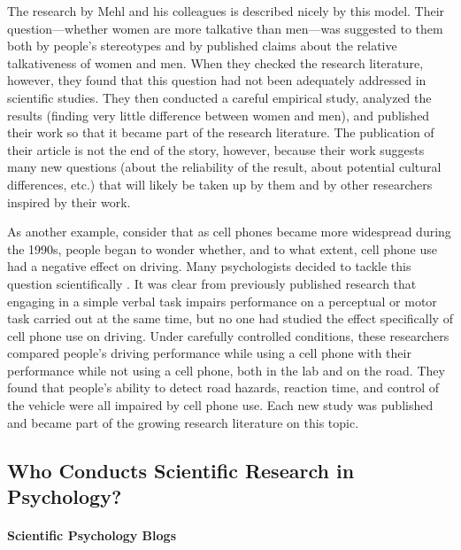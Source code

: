 The research by Mehl and his colleagues is described nicely by this model. Their question---whether women are more talkative than men---was suggested to them both by people's stereotypes and by published claims about the relative talkativeness of women and men. When they checked the research literature, however, they found that this question had not been adequately addressed in scientific studies. They then conducted a careful empirical study, analyzed the results (finding very little difference between women and men), and published their work so that it became part of the research literature. The publication of their article is not the end of the story, however, because their work suggests many new questions (about the reliability of the result, about potential cultural differences, etc.) that will likely be taken up by them and by other researchers inspired by their work.

As another example, consider that as cell phones became more widespread during the 1990s, people began to wonder whether, and to what extent, cell phone use had a negative effect on driving. Many psychologists decided to tackle this question scientifically \citep{collet_phoning_2010}. It was clear from previously published research that engaging in a simple verbal task impairs performance on a perceptual or motor task carried out at the same time, but no one had studied the effect specifically of cell phone use on driving. Under carefully controlled conditions, these researchers compared people's driving performance while using a cell phone with their performance while not using a cell phone, both in the lab and on the road. They found that people's ability to detect road hazards, reaction time, and control of the vehicle were all impaired by cell phone use. Each new study was published and became part of the growing research literature on this topic.

\subsection{Who Conducts Scientific Research in Psychology?}

\paragraph{Scientific Psychology Blogs}

